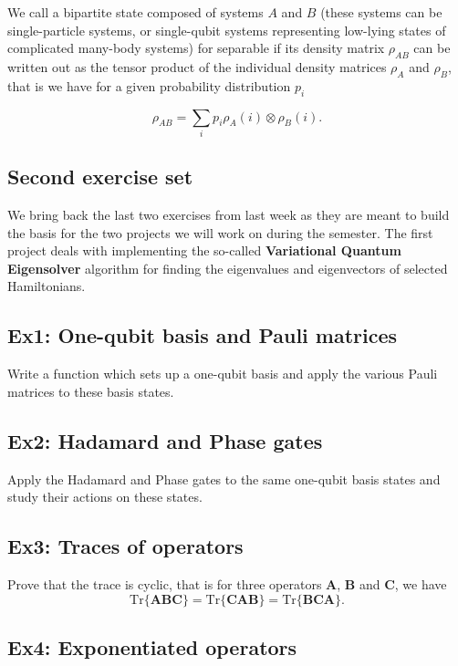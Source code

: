 We call a bipartite state composed of systems $A$ and $B$ (these
systems can be single-particle systems, or single-qubit systems
representing low-lying states of complicated many-body systems) for
separable if its density matrix $\rho_{AB}$ can be written out as the
tensor product of the individual density matrices $\rho_A$ and
$\rho_B$, that is we have for a given probability distribution $p_i$

\[
\rho_{AB}=\sum_ip_i\rho_A(i)\otimes \rho_B(i).
\]

\subsection{Second exercise set}

We bring back the  last two exercises from last week as they are meant to build the basis for
the two projects we will work on during the semester.  The first
project deals with implementing the so-called
\textbf{Variational Quantum Eigensolver} algorithm for finding the eigenvalues and eigenvectors of selected Hamiltonians.

\subsection{Ex1: One-qubit basis and  Pauli matrices}

Write a function which sets up a one-qubit basis and apply the various Pauli matrices to these basis states.

\subsection{Ex2: Hadamard and Phase gates}

Apply the Hadamard and Phase gates to the same one-qubit basis states and study their actions on these states.

\subsection{Ex3: Traces of operators}

Prove that the trace is cyclic, that is for three operators $\bm{A}$, $\bm{B}$ and $\bm{C}$, we have
\[
\mathrm{Tr}\{\bm{ABC}\}=\mathrm{Tr}\{\bm{CAB}\}=\mathrm{Tr}\{\bm{BCA}\}.
\]

\subsection{Ex4: Exponentiated operators}

